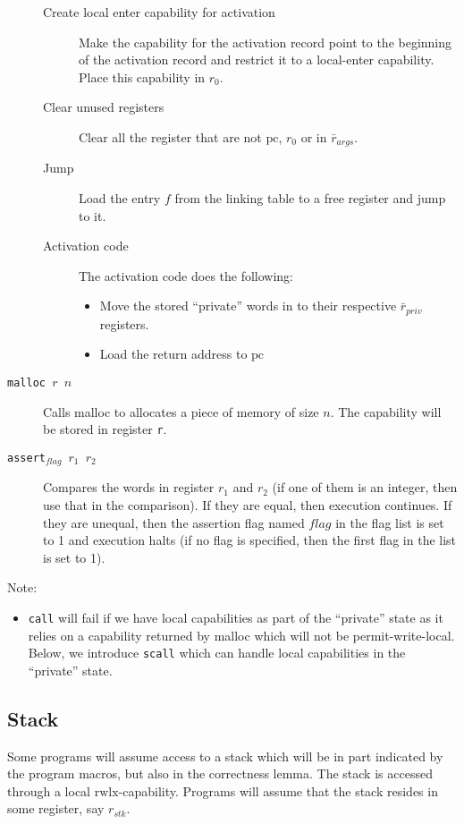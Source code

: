 \documentclass[a4paper]{article}
\newcommand{\var}[1]{\mathit{#1}}
\newcommand{\pcreg}{\mathrm{pc}}
\newcommand{\plainperm}[1]{\mathrm{#1}}
\newcommand{\rwlx}{\plainperm{rwlx}}
\begin{document}
\begin{description}
\begin{description}
\begin{itemize}
  \end{itemize}
  \item [Create local enter capability for activation] Make the capability for the activation record point to the beginning of the activation record and restrict it to a local-enter capability. Place this capability in $r_0$.
  \item [Clear unused registers]
    Clear all the register that are not $\pcreg$, $r_0$ or in $\bar{r}_{\var{args}}$.
  \item [Jump] Load the entry $f$ from the linking table to a free register and jump to it.
  \item [Activation code] The activation code does the following:
    \begin{itemize}
    \item Move the stored ``private'' words in to their respective $\bar{r}_{\var{priv}}$ registers.
    \item Load the return address to $\pcreg$
    \end{itemize}
\end{description}
\item[\texttt{malloc $r$ $n$}] Calls malloc to allocates a piece of memory of size $n$. The capability will be stored in register \texttt{r}.
\item[\texttt{assert$_{\var{flag}}$ $r_1$ $r_2$}] Compares the words in register $r_1$ and $r_2$ (if one of them is an integer, then use that in the comparison). If they are equal, then execution continues. If they are unequal, then the assertion flag named $flag$ in the flag list is set to 1 and execution halts (if no flag is specified, then the first flag in the list is set to 1).
\end{description}
Note:
\begin{itemize}
\item \texttt{call} will fail if we have local capabilities as part of the ``private'' state as it relies on a capability returned by malloc which will not be permit-write-local. Below, we introduce \texttt{scall} which can handle local capabilities in the ``private'' state.
\end{itemize}
\subsection{Stack}
Some programs will assume access to a stack which will be in part indicated by the program macros, but also in the correctness lemma. The stack is accessed through a local $\rwlx$-capability. Programs will assume that the stack resides in some register, say $r_{\var{stk}}$.
\end{document}
